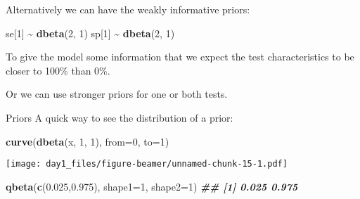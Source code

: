 \documentclass[
  ignorenonframetext,
]{beamer}
\newenvironment{Shaded}{\begin{snugshade}}{\end{snugshade}}
\newcommand{\AttributeTok}[1]{\textcolor[rgb]{0.13,0.29,0.53}{#1}}
\newcommand{\DecValTok}[1]{\textcolor[rgb]{0.00,0.00,0.81}{#1}}
\newcommand{\DocumentationTok}[1]{\textcolor[rgb]{0.56,0.35,0.01}{\textbf{\textit{#1}}}}
\newcommand{\FloatTok}[1]{\textcolor[rgb]{0.00,0.00,0.81}{#1}}
\newcommand{\FunctionTok}[1]{\textcolor[rgb]{0.13,0.29,0.53}{\textbf{#1}}}
\newcommand{\NormalTok}[1]{#1}
\newcommand{\SpecialCharTok}[1]{\textcolor[rgb]{0.81,0.36,0.00}{\textbf{#1}}}
\begin{document}
\begin{frame}[fragile]
Alternatively we can have the weakly informative priors:

\scriptsize

\begin{Shaded}
\begin{Highlighting}[]
\NormalTok{  se[}\DecValTok{1}\NormalTok{] }\SpecialCharTok{\textasciitilde{}} \FunctionTok{dbeta}\NormalTok{(}\DecValTok{2}\NormalTok{, }\DecValTok{1}\NormalTok{)}
\NormalTok{  sp[}\DecValTok{1}\NormalTok{] }\SpecialCharTok{\textasciitilde{}} \FunctionTok{dbeta}\NormalTok{(}\DecValTok{2}\NormalTok{, }\DecValTok{1}\NormalTok{)}
\end{Highlighting}
\end{Shaded}

\normalsize

To give the model some information that we expect the test
characteristics to be closer to 100\% than 0\%.

\pause

Or we can use stronger priors for one or both tests.
\end{frame}

\begin{frame}[fragile]
\begin{block}{Priors}
\protect\hypertarget{priors}{}
A quick way to see the distribution of a prior:

\scriptsize

\begin{Shaded}
\begin{Highlighting}[]
\FunctionTok{curve}\NormalTok{(}\FunctionTok{dbeta}\NormalTok{(x, }\DecValTok{1}\NormalTok{, }\DecValTok{1}\NormalTok{), }\AttributeTok{from=}\DecValTok{0}\NormalTok{, }\AttributeTok{to=}\DecValTok{1}\NormalTok{)}
\end{Highlighting}
\end{Shaded}

\texttt{[image: day1\_files/figure-beamer/unnamed-chunk-15-1.pdf]}

\begin{Shaded}
\begin{Highlighting}[]
\FunctionTok{qbeta}\NormalTok{(}\FunctionTok{c}\NormalTok{(}\FloatTok{0.025}\NormalTok{,}\FloatTok{0.975}\NormalTok{), }\AttributeTok{shape1=}\DecValTok{1}\NormalTok{, }\AttributeTok{shape2=}\DecValTok{1}\NormalTok{)}
\DocumentationTok{\#\# [1] 0.025 0.975}
\end{Highlighting}
\end{Shaded}

\normalsize
\end{block}
\end{frame}
\end{document}
